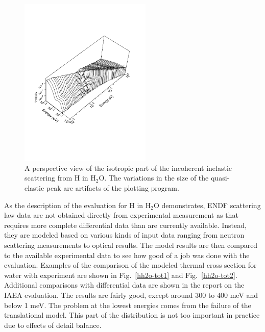 \begin{figure}[p]\centering
\includegraphics[keepaspectratio, height=3.2in, angle=0]{figs/hh2o-3dack}
\caption[A perspective view of the isotropic part of the incoherent
   inelastic scattering from H in H$_2$O.]
  {A perspective view of the isotropic part of the incoherent
   inelastic scattering from H in H$_2$O.  The variations in the
   size of the quasi-elastic peak are artifacts of the plotting program.}
\label{hh2o-3d}
\end{figure}

As the description of the evaluation for H in H$_2$O demonstrates, ENDF
scattering law data are not obtained directly from experimental
measurement as that requires more complete differential data than
are currently available. Instead, they are modeled based on various
kinds of input data ranging from neutron scattering measurements
to optical results. The model results are then compared to the
available experimental data to see how good of a job was done with the
evaluation. Examples of the comparison of the modeled thermal cross
section for water with
experiment\cite{Dritsa,Heinloth,SmithRR,Walton,Springer,Simpson,Russell}
are shown in Fig.~\ref{hh2o-tot1} and Fig.~\ref{hh2o-tot2}.
Additional comparisons with differential data are shown in the
report on the IAEA evaluation\cite{mattes}.  The results
are fairly good, except around 300 to 400 meV and below 1 meV.
The problem at the lowest energies comes from the failure of the
translational model.  This part of the distribution is not too
important in practice due to effects of detail balance.


